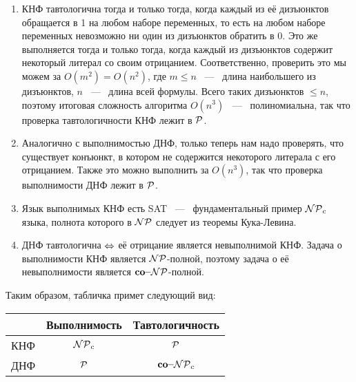 \documentclass[a4paper,12pt]{article}
\begin{document}
\begin{solution}
\begin{enumerate}
		\begin{enumerate}
			
			\item КНФ тавтологична тогда и только тогда, когда каждый из её дизъюнктов обращается в 1 на любом наборе переменных, то есть на любом наборе переменных невозможно ни один из дизъюнктов обратить в 0. Это же выполняется тогда и только тогда, когда каждый из дизъюнктов содержит некоторый литерал со своим отрицанием. Соответственно, проверить это мы можем за $O(m^2) = O(n^2)$, где $m \le n$ ~---~ длина наибольшего из дизъюнктов, $n$ ~---~ длина всей формулы. Всего таких дизъюнктов $\le n$, поэтому итоговая сложность алгоритма $O(n^3)$ ~---~ полиномиальна, так что проверка тавтологичности КНФ лежит в $\P$.
			
			\item Аналогично с выполнимостью ДНФ, только теперь нам надо проверять, что существует конъюнкт, в котором не содержится некоторого литерала с его отрицанием. Также это можно выполнить за $O(n^3)$, так что проверка выполнимости ДНФ лежит в $\P$.
			
			\item Язык выполнимых КНФ есть SAT ~---~ фундаментальный пример $\NP_c$ языка, полнота которого в $\NP$ следует из теоремы Кука-Левина.
			
			\item ДНФ тавтологична $\LRa$ её отрицание является невыполнимой КНФ. Задача о выполнимости КНФ является $\NP$-полной, поэтому задача о её невыполнимости является $\coNP$-полной.
			
		\end{enumerate}
		
		Таким образом, табличка примет следующий вид:
		 \begin{center}
			\begin{tabular}{|c|c|c|}
				\hline
				& Выполнимость & Тавтологичность \\
				\hline
				КНФ & $\NP_c$ & $\P$ \\
				\hline
				ДНФ  & $\P$  &  $\coNP_c$ \\
				\hline
			\end{tabular}
		\end{center}
		
	\end{enumerate}
	
	
\end{solution}
\end{document}

